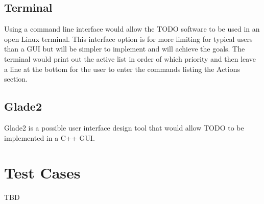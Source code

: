 \documentclass[12pt]{article}
\begin{document}
\subsection{Terminal}
Using a command line interface would allow the TODO software to be used in an open Linux terminal. This interface option is for more limiting for typical users than a GUI but will be simpler to implement and will achieve the goals. The terminal would print out the active list in order of which priority and then leave a line at the bottom for the user to enter the commands listing the Actions section.

\subsection{Glade2}
Glade2 is a possible user interface design tool that would allow TODO to be implemented in a C++ GUI.  


\section{Test Cases}
TBD


\end{document}
